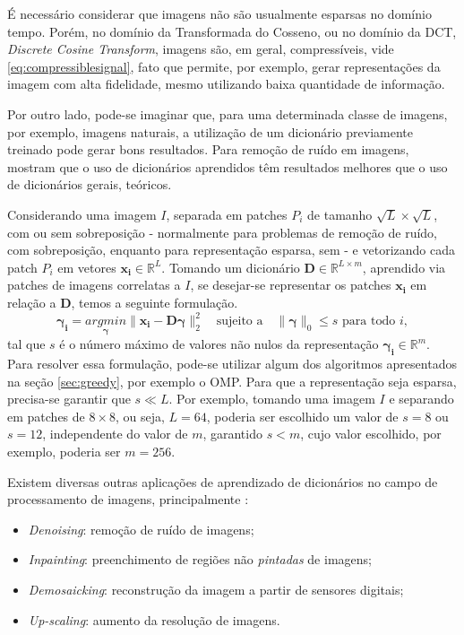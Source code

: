 \documentclass[cic,tc]{iiufrgs}
\renewcommand{\vec}[1]{\bm{#1}}
\newcommand{\mat}[1]{\bm{#1}}
\begin{document}
É necessário considerar que imagens não são usualmente esparsas no domínio tempo.
Porém, no domínio da Transformada do Cosseno, ou no domínio da DCT, \textit{Discrete Cosine Transform}, 
imagens são, em geral, compressíveis, vide \eqref{eq:compressiblesignal}, fato 
que permite, por exemplo, gerar representações da imagem com alta fidelidade, mesmo
utilizando baixa quantidade de informação.

Por outro lado, pode-se imaginar que, para uma determinada classe de imagens,
por exemplo, imagens naturais, a utilização de um dicionário previamente treinado 
pode gerar bons resultados. Para remoção de ruído em imagens, \citet{EladDenoising} 
mostram que o uso de dicionários aprendidos têm resultados melhores que o uso de 
dicionários gerais, teóricos.

Considerando uma imagem $I$, separada em patches $P_i$ de tamanho $\sqrt{L}\times\sqrt{L}$, 
com ou sem sobreposição - normalmente para problemas de remoção de ruído, com sobreposição,
enquanto para representação esparsa, sem - e vetorizando cada patch $P_i$ em vetores
$\vec{x_i} \in \mathbb{R}^L$. Tomando um dicionário $\mat{D} \in \mathbb{R}^{L\times m}$, 
aprendido via patches de imagens correlatas a $I$, se desejar-se representar os patches 
$\vec{x_i}$ em relação a $\mat{D}$, temos a seguinte formulação.
\begin{equation}
    \label{eq:patchcoding}
    \vec{\gamma_i} = \underset{\vec{\gamma}}{argmin} \lVert \vec{x_i} - \mat{D}\vec{\gamma} \rVert_2^2
    \hspace{1em} \text{sujeito a} \hspace{1em}
    \lVert \vec{\gamma} \rVert_0 \le s
    \text{ para todo } i,
\end{equation}
tal que $s$ é o número máximo de valores não nulos da representação $\vec{\gamma_i} \in \mathbb{R}^m$.
Para resolver essa formulação, pode-se utilizar algum dos algoritmos apresentados na
seção \ref{sec:greedy}, por exemplo o OMP. 
Para que a representação seja esparsa, precisa-se garantir que $s \ll L$.
Por exemplo, tomando uma imagem $I$ e separando em patches de $8\times 8$, ou seja,
$L = 64$, poderia ser escolhido um valor de $s = 8$ ou $s=12$, independente do valor 
de $m$, garantido $s < m$, cujo valor escolhido, por exemplo, poderia ser $m = 256$.

Existem diversas outras aplicações de aprendizado de dicionários no campo de processamento de
imagens, principalmente \cite{MairalSparse}:
\begin{itemize}
    \item \textit{Denoising}: remoção de ruído de imagens;
    \item \textit{Inpainting}: preenchimento de regiões não \textit{pintadas} de imagens;
    \item \textit{Demosaicking}: reconstrução da imagem a partir de sensores digitais;
    \item \textit{Up-scaling}: aumento da resolução de imagens.
\end{itemize}
\end{document}
